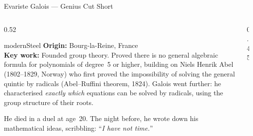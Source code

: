 \begin{frame}[shrink=18]{Evariste Galois --- Genius Cut Short}

  \begin{columns}[T]
    \begin{column}{0.52\textwidth}
      \begin{personbox}{modernSteel}
        \textbf{Origin:} Bourg-la-Reine, France\\[3pt]
        \textbf{Key work:} Founded \alert{group theory}. Proved there is no
        general algebraic formula for polynomials of degree~5 or higher,
        building on Niels Henrik Abel (1802--1829, Norway) who first proved
        the impossibility of solving the general quintic by radicals
        (Abel--Ruffini theorem, 1824).
        Galois went further: he characterised \emph{exactly which} equations
        can be solved by radicals, using the group structure of their roots.
      \end{personbox}

      \vspace{0.4em}
      \begin{insightbox}
        He died in a duel at age~20. The night before, he wrote down his
        mathematical ideas, scribbling: ``\emph{I have not time.}''
      \end{insightbox}
    \end{column}

    \begin{column}{0.45\textwidth}
    \end{column}
  \end{columns}

\end{frame}

